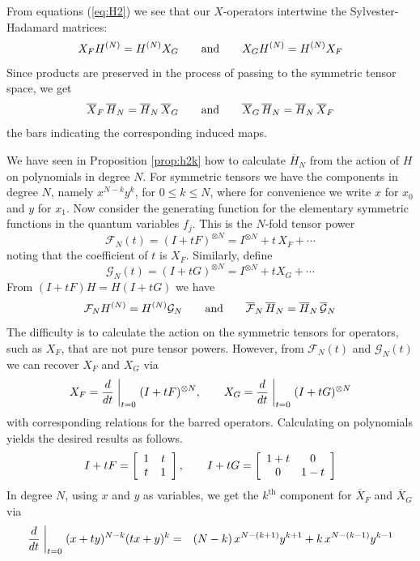 \documentclass[12pt]{article}
\def\dirs#1.{x^{N-{(#1)}}y^{#1}}  %
\numberwithin{equation}{section}
\begin{document}
From equations (\ref{eq:H2}) we see that our $X$-operators intertwine
the Sylvester-Hadamard matrices:  
$$
            X_F H^{(N)} = H^{(N)} X_G \qquad\hbox{and}\qquad X_G H^{(N)} = H^{(N)} X_F
$$
Since products are preserved in the process of passing to
the symmetric tensor space, we get
\begin{equation} \label{eq:spec}
       \overline{X}_F\,\overline{H}_N  = \overline{H}_N  \,\overline{X}_G \qquad \hbox{and}\qquad
       \overline{X}_G\,\overline{H}_N = \overline{H}_N  \,\overline{X}_F 
\end{equation}
the bars indicating the corresponding induced maps.\bigskip

We have seen in Proposition \ref{prop:h2k} how to calculate $\overline{H}_N$ from the action of $H$ on
polynomials in degree $N$. For symmetric tensors we have the
components in degree $N$, namely 
$ 
      x^{N-k}y^k
$, 
for $0\le k\le N$, where for convenience we write $x$ for $x_0$ and $y$ for $x_1$.
Now consider the generating function for the elementary symmetric
functions in the quantum variables $f_j$. This is the $N$-fold
tensor power
$$ 
     {\mathcal F}_N (t) = (I+tF)^{\otimes N}
                    = I^{\otimes N}+t\,X_F+\cdots
$$
noting that the coefficient of $t$ is $X_F$. 
Similarly, define
$$
     {\mathcal G}_N(t) = (I+tG)^{\otimes N}
                   = I^{\otimes N}+tX_G+\cdots
$$
  From $(I+tF)H=H(I+tG)$ we have
$$
   {\mathcal F}_NH^{(N)}  =  H^{(N)}{\mathcal G}_N        
   \qquad\hbox{and}\qquad 
   \overline{\mathcal F}_N \,\overline{H}_N  
 = \overline{H}_N \,\overline{\mathcal G}_N
$$
The difficulty is to calculate the action on the symmetric tensors for
operators, such as $X_F$, that are not pure tensor powers. However,
from ${\mathcal F}_N(t)$ and ${\mathcal G}_N(t)$ we can 
recover $X_F$ and $X_G$ via
$$
          X_F=\frac{d}{dt}\biggm|_{t=0}(I+tF)^{\otimes N},
     \qquad
          X_G=\frac{d}{dt}\biggm|_{t=0}(I+tG)^{\otimes N}
$$
with corresponding relations for the barred operators.
Calculating on polynomials yields the desired results as follows.
$$ 
          I+tF = \left[\begin{array}{cc}1&t\cr t&1\cr\end{array}\right],\qquad
          I+tG = \left[\begin{array}{cc}1+t&0\cr 0&1-t\cr\end{array}\right]
$$
In degree $N$, using $x$ and $y$ as variables, we get the 
$k^{\mathrm{th}}$ component for $\overline{X}_F$ and $\overline{X}_G$
via
\begin{eqnarray*}
    \frac{d}{dt}\biggm|_{t=0}(x+ty)^{N-k}(tx+y)^k
                     &=& (N-k)\,\dirs k+1. +k\,\dirs k-1. 
                   \end{eqnarray*}
\end{document}
